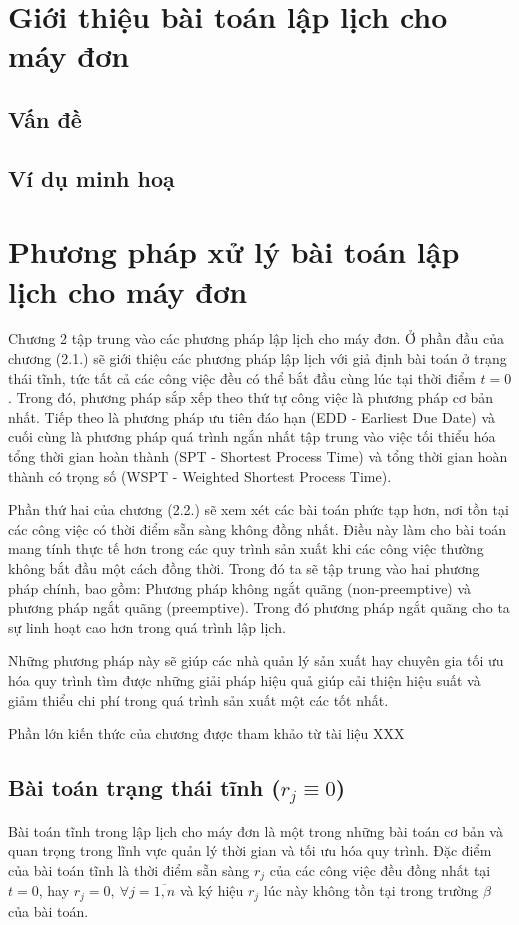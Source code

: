 \documentclass[12pt,a4paper]{report}
\begin{document}
\chapter{Giới thiệu bài toán lập lịch cho máy đơn}
\section{Vấn đề}
\section{Ví dụ minh hoạ}
\chapter{Phương pháp xử lý bài toán lập lịch cho máy đơn}
Chương 2 tập trung vào các phương pháp lập lịch cho máy đơn. Ở phần đầu của chương (2.1.) sẽ giới thiệu các phương pháp lập lịch với giả định bài toán ở trạng thái tĩnh, tức tất cả các công việc đều có thể bắt đầu cùng lúc tại thời điểm $t = 0$. Trong đó, phương pháp sắp xếp theo thứ tự công việc là phương pháp cơ bản nhất. Tiếp theo là phương pháp ưu tiên đáo hạn (EDD - Earliest Due Date) và cuối cùng là phương pháp quá trình ngắn nhất tập trung vào việc tối thiểu hóa tổng thời gian hoàn thành (SPT - Shortest Process Time) và tổng thời gian hoàn thành có trọng số (WSPT - Weighted Shortest Process Time).

Phần thứ hai của chương (2.2.) sẽ xem xét các bài toán phức tạp hơn, nơi tồn tại các công việc có thời điểm sẵn sàng không đồng nhất. Điều này làm cho bài toán mang tính thực tế hơn trong các quy trình sản xuất khi các công việc thường không bắt đầu một cách đồng thời. Trong đó ta sẽ tập trung vào hai phương pháp chính, bao gồm: Phương pháp không ngắt quãng (non-preemptive) và phương pháp ngắt quãng (preemptive). Trong đó phương pháp ngắt quãng cho ta sự linh hoạt cao hơn trong quá trình lập lịch.

Những phương pháp này sẽ giúp các nhà quản lý sản xuất hay chuyên gia tối ưu hóa quy trình tìm được những giải pháp hiệu quả giúp cải thiện hiệu suất và giảm thiểu chi phí trong quá trình sản xuất một các tốt nhất.

Phần lớn kiến thức của chương được tham khảo từ tài liệu XXX

\section{Bài toán trạng thái tĩnh ($r_j \equiv 0$)}
Bài toán tĩnh trong lập lịch cho máy đơn là một trong những bài toán cơ bản và quan trọng trong lĩnh vực quản lý thời gian và tối ưu hóa quy trình. Đặc điểm của bài toán tĩnh là thời điểm sẵn sàng $r_j$ của các công việc đều đồng nhất tại $t=0$, hay $r_j = 0, \: \forall j=\overline{1,n}$ và ký hiệu $r_j$ lúc này không tồn tại trong trường $\beta$ của bài toán.
\end{document}
